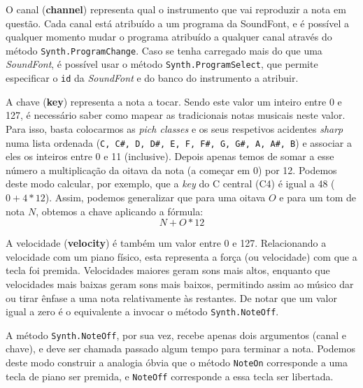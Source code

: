 O canal (\textbf{channel}) representa qual o instrumento que vai reproduzir a nota em questão. Cada canal está atribuído a um programa da SoundFont, e é possível a qualquer momento mudar o programa atribuído a qualquer canal através do método \texttt{Synth.ProgramChange}. Caso se tenha carregado mais do que uma \textit{SoundFont}, é possível usar o método \texttt{Synth.ProgramSelect}, que permite especificar o \texttt{id} da \textit{SoundFont} e do banco do instrumento a atribuir.

A chave (\textbf{key}) representa a nota a tocar. Sendo este valor um inteiro entre 0 e 127, é necessário saber como mapear as tradicionais notas musicais neste valor. Para isso, basta colocarmos as \textit{pich classes} e os seus respetivos acidentes \textit{sharp} numa lista ordenada (\verb|C, C#, D, D#, E, F, F#, G, G#, A, A#, B|) e associar a eles os inteiros entre 0 e 11 (inclusive). Depois apenas temos de somar a esse número a multiplicação da oitava da nota (a começar em 0) por 12. Podemos deste modo calcular, por exemplo, que a \textit{key} do C central (C4) é igual a 48 ($0 + 4 * 12$). Assim, podemos generalizar que para uma oitava $O$ e para um tom de nota $N$, obtemos a chave aplicando a fórmula:
$$N + O * 12$$

A velocidade (\textbf{velocity}) é também um valor entre 0 e 127. Relacionando a velocidade com um piano físico, esta representa a força (ou velocidade) com que a tecla foi premida. Velocidades maiores geram sons mais altos, enquanto que velocidades mais baixas geram sons mais baixos, permitindo assim ao músico dar ou tirar ênfase a uma nota relativamente às restantes. De notar que um valor igual a zero é o equivalente a invocar o método \texttt{Synth.NoteOff}.

A método \texttt{Synth.NoteOff}, por sua vez, recebe apenas dois argumentos (canal e chave), e deve ser chamada passado algum tempo para terminar a nota. Podemos deste modo construir a analogia óbvia que o método \texttt{NoteOn} corresponde a uma tecla de piano ser premida, e \texttt{NoteOff} corresponde a essa tecla ser libertada.
